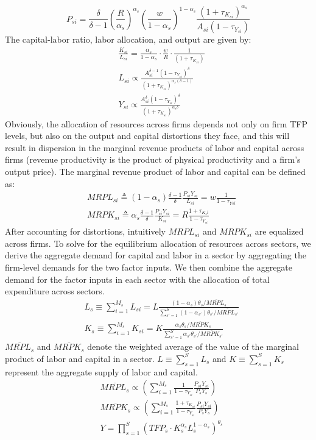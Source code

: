 \documentclass{article}
\begin{document}
\begin{equation*}
    P_{si}=\frac{\delta}{\delta-1}(\frac{R}{\alpha_s})^{\alpha_s}(\frac{w}{1-\alpha_s})^{1-\alpha_s}\frac{(1+\tau_{K_{si}})^{\alpha_s}}{A_{si}(1-\tau_{Y_{si}})}
\end{equation*}
The capital-labor ratio, labor allocation, and output are given by:
\begin{align*}
    &\frac{K_{si}}{L_{si}}=\frac{\alpha_s}{1-\alpha_s}\cdot\frac{w}{R}\cdot\frac{1}{(1+\tau_{K_{si}})}\\
    &L_{si} \propto \frac{A_{si}^{\delta-1}(1-\tau_{Y_{si}})^\delta}{(1+\tau_{K_{si}})^{\alpha_s(\delta-1)}}\\
    &Y_{si} \propto \frac{A_{si}^\delta(1-\tau_{Y_{si}})^\delta}{(1+\tau_{K_{si}})^{\alpha_s\delta}}
\end{align*}
Obviously, the allocation of resources across firms depends not only on firm TFP levels, but also on the output and capital distortions they face, and this will result in dispersion in the marginal revenue products of labor and capital across firms (revenue productivity is the product of physical productivity and a firm's output price). The marginal revenue product of labor and capital can be defined as:
\begin{align*}
    &MRPL_{si} \triangleq (1-\alpha_s) \frac{\delta-1}{\delta} \frac{P_{si}Y_{si}}{L_{si}}=w \frac{1}{1-\tau_{Y{si}}}\\
    &MRPK_{si} \triangleq \alpha_s \frac{\delta-1}{\delta} \frac{P_{si}Y_{si}}{K_{si}}=R \frac{1+\tau_{K_si}}{1-\tau_{Y_{si}}}
\end{align*}
After accounting for distortions, intuitively $MRPL_{si}$ and $MRPK_{si}$ are equalized across firms. To solve for the equilibrium allocation of resources across sectors, we derive the aggregate demand for capital and labor in a sector by aggregating the firm-level demands for the two factor inputs. We then combine the aggregate demand for the factor inputs in each sector with the allocation of total expenditure across sectors.
\begin{align*}
    &L_s \equiv \sum_{i=1}^{M_s}L_{si}=L\frac{(1-\alpha_s)\theta_s/\overline{MRPL_s}}{\sum_{s\prime=1}^S(1-\alpha_{s\prime})\theta_{s\prime}/\overline{MRPL_{s\prime}}}\\
    &K_s \equiv \sum_{i=1}^{M_s}K_{si}=K\frac{\alpha_s\theta_s/\overline{MRPK_s}}{\sum_{s\prime=1}^S\alpha_{s\prime}\theta_{s\prime}/\overline{MRPK_{s\prime}}}
\end{align*}
$\overline{MRPL_s}$ and $\overline{MRPK_s}$ denote the weighted average of the value of the marginal product of labor and capital in a sector. $L \equiv \sum_{s=1}^S L_s$ and $K \equiv \sum_{s=1}^S K_s$ represent the aggregate supply of labor and capital.
\begin{align*}
    &\overline{MRPL_s} \propto (\sum_{i=1}^{M_s} \frac{1}{1-\tau_{Y_{si}}}\frac{P_{si}Y_{si}}{P_sY_s})\\
    &\overline{MRPK_s} \propto (\sum_{i=1}^{M_s} \frac{1+\tau_{K_{si}}}{1-\tau_{Y_{si}}}\frac{P_{si}Y_{si}}{P_sY_s})\\
    &Y=\prod_{s=1}^S (TFP_s \cdot K_s^{\alpha_s} L_s^{1-\alpha_s})^{\theta_s}\\
\end{align*}
\end{document}
